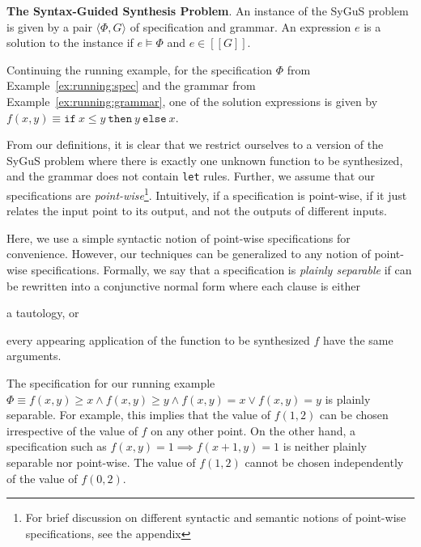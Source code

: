 \documentclass{llncs}
\newcommand\tuple[1]{\langle #1 \rangle}
\newcommand\Expr{e}
\newcommand\Spec{\Phi}
\newcommand\Grammar{G}
\newcommand\sem[1]{[\![ #1 ]\!]}
\newcommand\SynthFun{f}
\newcommand\ITE[3]{\mathtt{if}~#1~\mathtt{then}~#2~\mathtt{else}~#3}
\renewcommand{\paragraph}[1]{\par\noindent\textbf{#1}.}
\begin{document}
\paragraph{The Syntax-Guided Synthesis Problem}
An instance of the SyGuS problem is given by a pair $\tuple { \Spec,
\Grammar }$ of specification and grammar.
An expression $\Expr$ is a solution to the instance if $\Expr \models
\Spec$ and $\Expr \in \sem{\Grammar}$.

\begin{example}
  Continuing the running example, for the specification $\Spec$ from
  Example~\ref{ex:running:spec} and the grammar from
  Example~\ref{ex:running:grammar}, one of the solution expressions is
  given by $\SynthFun(x, y) \equiv \ITE{x \leq y}{y}{x}$.
\end{example}

From our definitions, it is clear that we restrict ourselves to a
version of the SyGuS problem where there is exactly one unknown function
to be synthesized, and the grammar does not contain {\tt let} rules.
Further, we assume that our specifications are {\em
  point-wise}\footnote{For brief discussion on different syntactic and
semantic notions of point-wise specifications, see the appendix}.
Intuitively, if a specification is point-wise, if it just relates the
input point to its output, and not the outputs of different inputs.

Here, we use a simple syntactic notion of point-wise specifications for
convenience.
However, our techniques can be generalized to any notion of point-wise
specifications.
Formally, we say that a specification is {\em plainly separable} if can
be rewritten into a conjunctive normal form where each clause is either
\begin{inparaenum}[(a)]
\item a tautology, or
\item every appearing application of the function to be synthesized
  $\SynthFun$ have the same arguments.
\end{inparaenum}

\begin{example}
  The specification for our running example $\Spec \equiv \SynthFun(x,
  y) \geq x \wedge \SynthFun(x, y) \geq y \wedge \SynthFun(x, y) = x
  \vee \SynthFun(x, y) = y$ is plainly separable.
  For example, this implies that the value of $\SynthFun(1, 2)$ can be
  chosen irrespective of the value of $\SynthFun$ on any other point.
  On the other hand, a specification such as $\SynthFun(x, y) = 1
  \implies \SynthFun(x + 1, y) = 1$ is neither plainly separable nor
  point-wise.
  The value of $\SynthFun(1, 2)$ cannot be chosen independently of the
  value of $\SynthFun(0, 2)$.
\end{example}
\end{document}
